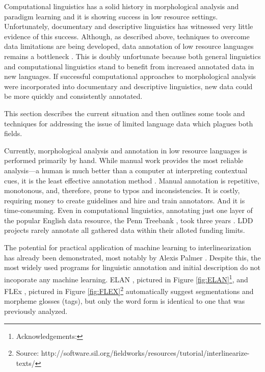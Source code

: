 \documentclass[12pt]{article}
\begin{document}
Computational linguistics has a solid history in morphological analysis and paradigm learning and it is showing success in low resource settings. Unfortunately, documentary and descriptive linguistics has witnessed very little evidence of this success. Although, as described above, techniques to overcome data limitations are being developed, data annotation of low resource languages remains a bottleneck \cite{holton_developing_2017}. This is doubly unfortunate because both general linguistics and computational linguistics stand to benefit from increased annotated data in new languages. If successful computational approaches to morphological analysis were incorporated into documentary and descriptive linguistics, new data could be more quickly and consistently annotated.

This section describes the current situation and then outlines some tools and techniques for addressing the issue of limited language data which plagues both fields.

Currently, morphological analysis and annotation in low resource languages is performed primarily by hand. While manual work provides the most reliable analysis---a human is much better than a computer at interpreting contextual cues, it is the least effective annotation method \cite{Baldridge06,baldridge_how_2009,palmer_semi-automated_2009}. Manual annotation is repetitive, monotonous, and, therefore, prone to typos and inconsistencies. It is costly, requiring money to create guidelines and hire and train annotators. And it is time-consuming. Even in computational linguistics, annotating just one layer of the popular English data resource, the Penn Treebank \cite{taylor_penn_2003}, took three years \cite{duong_natural_2017,he_human---loop_2016}. LDD projects rarely annotate all gathered data within their alloted funding limits. 

The potential for practical application of machine learning to interlinearization has already been demonstrated, most notably by Alexis Palmer . Despite this, the most widely used programs for linguistic annotation and initial description do not incoporate any machine learning. ELAN \cite{auer_elan_2010}, pictured in Figure \ref{fig:ELAN}\footnote{Acknowledgements: }, and FLEx \cite{Black06FLEX}, pictured in Figure \ref{fig:FLEX}\footnote{Source: http://software.sil.org/fieldworks/resources/tutorial/interlinearize-texts/} automatically suggest segmentations and morpheme glosses (tags), but only the word form is identical to one that was previously analyzed. 
\end{document}
